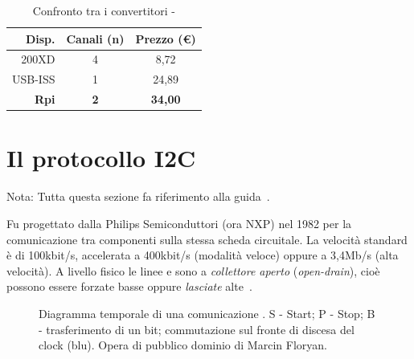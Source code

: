 	\begin{table}
		\begin{center}
		\caption{Confronto tra i convertitori \iic-\usb}
		\label{tab:convertitori}
		\begin{tabular}{r c c}
Disp.        & Canali (n)  & Prezzo (\euro)\\
			\hline
200XD        &  4          & 8,72\\
USB-ISS      &  1          & 24,89\\
\textbf{Rpi} &  \textbf{2} & \textbf{34,00}\\
			\hline
		\end{tabular}
		\end{center}
	\end{table}

% 

\section{Il protocollo I2C} \label{sez:protocollo_i2c}
{Nota: Tutta questa sezione fa riferimento alla guida~\cite{cit:primer}.}

    Fu progettato dalla Philips Semiconduttori (ora NXP) nel 1982
    per la comunicazione tra componenti sulla stessa scheda circuitale.
    La velocità standard è di 100kbit/s,
    accelerata a 400kbit/s (modalità veloce)
    oppure a 3,4Mb/s (alta velocità).
    A livello fisico le linee \sda{} e \scl{} sono a \emph{collettore aperto}
    (\textit{open-drain}),
    cioè possono essere forzate basse oppure \emph{lasciate} alte~\cite{cit:primer}.
	
\begin{figure}[t]
	\centering
{}
    \caption{Diagramma temporale di una comunicazione \iic{}. S - Start; P - Stop; B - trasferimento di un bit; commutazione sul fronte di discesa del clock (blu). Opera di pubblico dominio di Marcin Floryan.}
    \label{fig:i2c_trans}
\end{figure}


